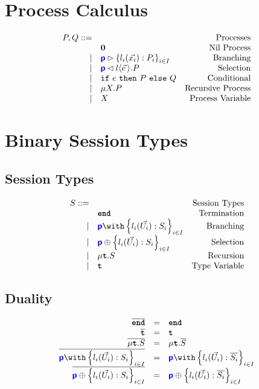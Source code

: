\documentclass{article}
\begin{document}
\section{Process Calculus}

\doublespacing
\[
\begin{array}{rlr}
    P, Q ::= & & \text{Processes} \\
     & \mathbf{0} & \text{Nil Process} \\
		\mid & {\color{blue}\bm{\mathsf{p}}} \rhd \left\{ {l_i(\vec{x_i}): P_i} \right\}_{i \in I} & \text{Branching} \\
		\mid & {\color{blue}\bm{\mathsf{p}}} \lhd {l \langle \vec{e}\,\rangle. P} & \text{Selection} \\
		\mid & \texttt{if}~{e}~\texttt{then}~{P}~\texttt{else}~{Q} & \text{Conditional} \\
		\mid & \mu X.{P} & \text{Recursive Process} \\
		\mid & X & \text{Process Variable} \\
\end{array}
\]
\singlespacing

\section{Binary Session Types}

\subsection{Session Types}

\doublespacing
\[
\begin{array}{rlr}
    S ::= & & \text{Session Types} \\
     & \tyend & \text{Termination} \\
		\mid & \tybra{p}{l_i(\vec{U_i}): S_i}{i \in I} & \text{Branching} \\
		\mid & \tysel{p}{l_i(\vec{U_i}): S_i}{i \in I} & \text{Selection} \\
		\mid & \tyrec{S} & \text{Recursion} \\
		\mid & \tyrecvar & \text{Type Variable} \\
\end{array}
\]
\singlespacing

\subsection{Duality}
\doublespacing
\[
\begin{array}{rcl}
		\dual{\tyend} & = & \tyend \\
		\dual{\tyrecvar} & = & \tyrecvar \\
		\dual{\tyrec{S}} & = & \tyrec{\dual{S}} \\
		\dual{\tybra{p}{l_i(\vec{U_i}): S_i}{i \in I}} & = & \tybra{p}{l_i(\vec{U_i}): \dual{S_i}}{i \in I} \\
		\dual{\tysel{p}{l_i(\vec{U_i}): S_i}{i \in I}} & = & \tysel{p}{l_i(\vec{U_i}): \dual{S_i}}{i \in I} \\
\end{array}
\]
\singlespacing
\end{document}
